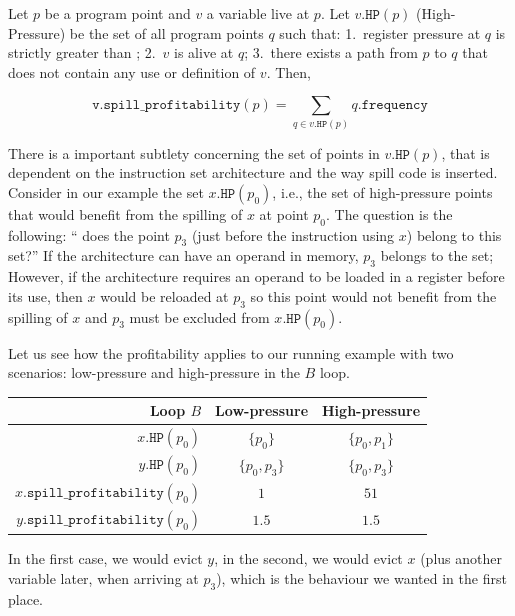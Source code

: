 {\begin{definition}
%
  Let $p$ be a program point and $v$ a variable live at $p$.
  Let $v.\texttt{HP}(p)$ (High-Pressure) be the set of all program points $q$ such that:
  1.~register pressure at $q$ is strictly greater than \regs;
  2.~$v$ is alive at $q$;
  3.~there exists a path from $p$ to $q$ that does not contain any use or definition of $v$.
  Then,

  $$\texttt{v.spill\_profitability}(p) = \sum_{q\in v.\texttt{HP}(p)} q.\texttt{frequency}$$
\end{definition}

There is a important subtlety concerning the set of points in $v.\texttt{HP}(p)$, that is dependent on the instruction set architecture and the way spill code is inserted.
Consider in our example the set $x.\texttt{HP}(p_0)$, i.e., the set of high-pressure points that would benefit from the spilling of $x$ at point $p_0$.
The question is the following: `` does the point $p_3$ (just before the instruction using $x$) belong to this set?''
If the architecture can have an operand in memory, $p_3$ belongs to the set;
However, if the architecture requires an operand to be loaded in a register before its use, then $x$ would be reloaded at $p_3$ so this point would not benefit from the spilling of $x$ and $p_3$ must be excluded from $x.\texttt{HP}(p_0)$.

Let us see how the profitability applies to our running example with two scenarios: low-pressure and high-pressure in the $B$ loop.

\begin{center}
  \begin{tabular}{r@{\quad}cc}
  Loop $B$ & Low-pressure & High-pressure \\
  \hline
  $x.\texttt{HP}(p_0)$ & $\{p_0\}$ & $\{p_0,p_1\}$ \\
  $y.\texttt{HP}(p_0)$ & $\{p_0,p_3\}$ & $\{p_0,p_3\}$ \\
  $x.\texttt{spill\_profitability}(p_0)$ & $1$ & $51$ \\
  $y.\texttt{spill\_profitability}(p_0)$ & $1.5$ & $1.5$ \\
\end{tabular}
\end{center}

In the first case, we would evict $y$, in the second, we would evict $x$ (plus another variable later, when arriving at $p_3$), which is the behaviour we wanted in the first place.

}
